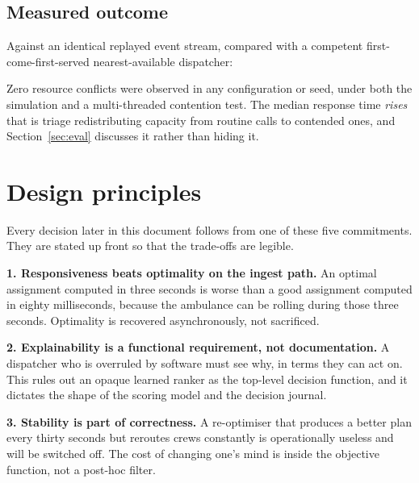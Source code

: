 \documentclass[11pt,a4paper]{article}
\newcommand{\dec}[2]{\textbf{#1} \textemdash{} #2}
\begin{document}
\subsection*{Measured outcome}

Against an identical replayed event stream, compared with a competent
first-come-first-served nearest-available dispatcher:

\begin{center}\small\end{center}

\noindent Zero resource conflicts were observed in any configuration or seed,
under both the simulation and a multi-threaded contention test. The median
response time \emph{rises} \textemdash{} that is triage redistributing capacity
from routine calls to contended ones, and Section~\ref{sec:eval} discusses it
rather than hiding it.

\section{Design principles}

Every decision later in this document follows from one of these five
commitments. They are stated up front so that the trade-offs are legible.

\begin{decbox}
\dec{1. Responsiveness beats optimality on the ingest path.}{An optimal
assignment computed in three seconds is worse than a good assignment computed
in eighty milliseconds, because the ambulance can be rolling during those
three seconds. Optimality is recovered asynchronously, not sacrificed.}
\end{decbox}

\begin{decbox}
\dec{2. Explainability is a functional requirement, not documentation.}{A
dispatcher who is overruled by software must see why, in terms they can act
on. This rules out an opaque learned ranker as the top-level decision
function, and it dictates the shape of the scoring model and the decision
journal.}
\end{decbox}

\begin{decbox}
\dec{3. Stability is part of correctness.}{A re-optimiser that produces a
better plan every thirty seconds but reroutes crews constantly is
operationally useless and will be switched off. The cost of changing one's
mind is inside the objective function, not a post-hoc filter.}
\end{decbox}
\end{document}
